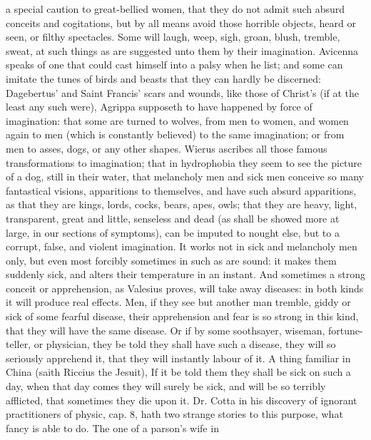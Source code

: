 {a special caution to great-bellied women, that they do not admit
such absurd conceits and cogitations, but by all means avoid those
horrible objects, heard or seen, or filthy spectacles. Some will laugh,
weep, sigh, groan, blush, tremble, sweat, at such things as are
suggested unto them by their imagination. Avicenna speaks of one that
could cast himself into a palsy when he list; and some can imitate the
tunes of birds and beasts that they can hardly be discerned:
Dagebertus' and Saint Francis' scars and wounds, like those of Christ's
(if at the least any such were), Agrippa supposeth to have
happened by force of imagination: that some are turned to wolves, from
men to women, and women again to men (which is constantly believed) to
the same imagination; or from men to asses, dogs, or any other shapes.
Wierus ascribes all those famous transformations to imagination;
that in hydrophobia they seem to see the picture of a dog, still in
their water, that melancholy men and sick men conceive so many
fantastical visions, apparitions to themselves, and have such absurd
apparitions, as that they are kings, lords, cocks, bears, apes, owls;
that they are heavy, light, transparent, great and little, senseless
and dead (as shall be showed more at large, in our  sections of
symptoms), can be imputed to nought else, but to a corrupt, false, and
violent imagination. It works not in sick and melancholy men only, but
even most forcibly sometimes in such as are sound: it makes them
suddenly sick, and alters their temperature in an instant. And
sometimes a strong conceit or apprehension, as Valesius proves,
will take away diseases: in both kinds it will produce real effects.
Men, if they see but another man tremble, giddy or sick of some fearful
disease, their apprehension and fear is so strong in this kind, that
they will have the same disease. Or if by some soothsayer, wiseman,
fortune-teller, or physician, they be told they shall have such a
disease, they will so seriously apprehend it, that they will instantly
labour of it. A thing familiar in China (saith Riccius the Jesuit),
If it be told them they shall be sick on such a day, when that
day comes they will surely be sick, and will be so terribly afflicted,
that sometimes they die upon it. Dr. Cotta in his discovery of ignorant
practitioners of physic, cap. 8, hath two strange stories to this
purpose, what fancy is able to do. The one of a parson's wife in
}
